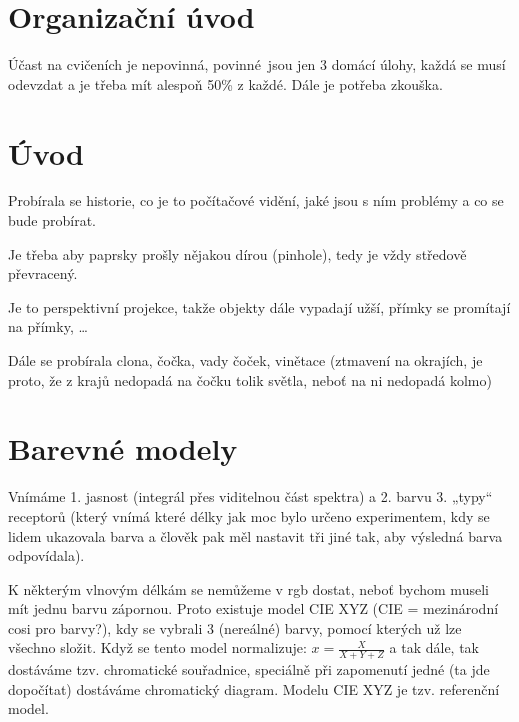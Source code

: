 \documentclass[12pt]{article}					%
\begin{document}

\section*{Organizační úvod}
\begin{poznamka}
	Účast na cvičeních je nepovinná, povinné jsou jen 3 domácí úlohy, každá se musí odevzdat a je třeba mít alespoň 50\% z každé. Dále je potřeba zkouška.
\end{poznamka}

\section{Úvod}
\begin{poznamka}
	Probírala se historie, co je to počítačové vidění, jaké jsou s ním problémy a co se bude probírat.
\end{poznamka}


\begin{definice}
	Je třeba aby paprsky prošly nějakou dírou (pinhole), tedy je vždy středově převracený.

	Je to perspektivní projekce, takže objekty dále vypadají užší, přímky se promítají na přímky, …
\end{definice}

\begin{poznamka}
	Dále se probírala clona, čočka, vady čoček, vinětace (ztmavení na okrajích, je proto, že z krajů nedopadá na čočku tolik světla, neboť na ni nedopadá kolmo)
\end{poznamka}


\section{Barevné modely}
\begin{definice}
	Vnímáme 1. jasnost (integrál přes viditelnou část spektra) a 2. barvu 3. „typy“ receptorů (který vnímá které délky jak moc bylo určeno experimentem, kdy se lidem ukazovala barva a člověk pak měl nastavit tři jiné tak, aby výsledná barva odpovídala).

	K některým vlnovým délkám se nemůžeme v rgb dostat, neboť bychom museli mít jednu barvu zápornou. Proto existuje model CIE XYZ (CIE = mezinárodní cosi pro barvy?), kdy se vybrali 3 (nereálné) barvy, pomocí kterých už lze všechno složit. Když se tento model normalizuje: $x = \frac{X}{X + Y + Z}$ a tak dále, tak dostáváme tzv. chromatické souřadnice, speciálně při zapomenutí jedné (ta jde dopočítat) dostáváme chromatický diagram. Modelu CIE XYZ je tzv. referenční model.
\end{definice}
\end{document}
